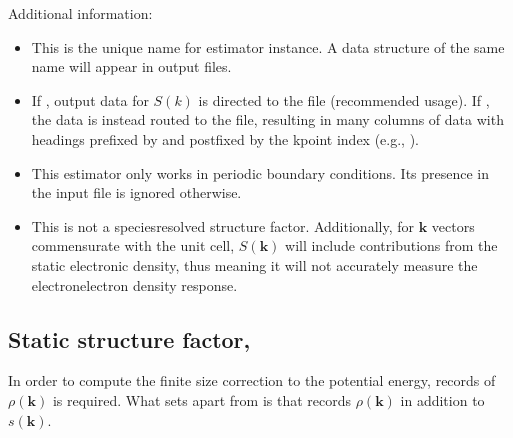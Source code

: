 \documentclass[letterpaper,10pt,english]{sphinxmanual}
\begin{document}
Additional information:
\begin{itemize}
\item {} 
 This is the unique name for estimator instance. A data
structure of the same name will appear in  output files.

\item {} 
 If , output data for \(S(k)\) is directed
to the  file (recommended usage). If , the
data is instead routed to the  file, resulting in many
columns of data with headings prefixed by  and postfixed by
the k\sphinxhyphen{}point index (e.g., ).

\item {} 
This estimator only works in periodic boundary conditions. Its
presence in the input file is ignored otherwise.

\item {} 
This is not a species\sphinxhyphen{}resolved structure factor. Additionally, for
\(\mathbf{k}\) vectors commensurate with the unit cell,
\(S(\mathbf{k})\) will include contributions from the static
electronic density, thus meaning it will not accurately measure the
electron\sphinxhyphen{}electron density response.

\end{itemize}
\def\sphinxLiteralBlockLabel{\label{\detokenize{hamiltonianobservable:listing-29}}}
\begin{sphinxVerbatim}[commandchars=\\\{\}]
     
\end{sphinxVerbatim}


\subsection{Static structure factor, }
\label{\detokenize{hamiltonianobservable:static-structure-factor-skall}}
In order to compute the finite size correction to the potential energy,
records of \(\rho(\mathbf{k})\) is required. What sets 
apart from  is that  records \(\rho(\mathbf{k})\) in
addition to \(s(\mathbf{k})\).
\end{document}
